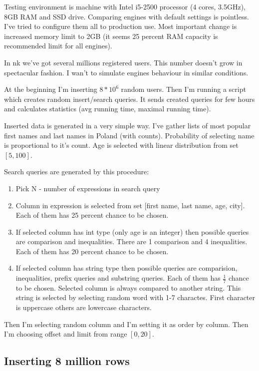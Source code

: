 \documentclass[10pt,a4paper]{article}
\begin{document}
Testing environment is machine with Intel i5-2500 processor (4 cores, 3.5GHz), 8GB RAM and SSD drive. Comparing engines with default settings is pointless. I've tried to configure them all to production use. Most important change is increased memory limit to 2GB (it seems 25 percent RAM capacity is recommended limit for all engines).

In nk we've got several millions registered users. This number doesn't grow in spectacular fashion. I wan't to simulate engines behaviour in similar conditions. 

At the beginning I'm inserting $8 * 10^6$ random users. Then I'm running a script which creates random insert/search queries. It sends created queries for few hours and calculates statistics (avg running time, maximal running time).

Inserted data is generated in a very simple way. I've gather lists of most popular first names and last names in Poland (with counts). Probability of selecting name is proportional to it's count. Age is selected with linear distribution from set $[5, 100]$.

Search queries are generated by this procedure:
\begin{enumerate}
\item Pick N - number of expressions in search query
\item Column in expression is selected from set [first name, last name, age, city]. Each of them has 25 percent chance to be chosen.
\item If selected column has int type (only age is an integer) then possible queries are comparison and inequalities. There are 1 comparison and 4 inequalities. Each of them has 20 percent chance to be chosen.
\item If selected column has string type then possible queries are comparision, inequalities, prefix queries and substring queries. Each of them has $\frac{1}{7}$ chance to be chosen. Selected column is always compared to another string. This string is selected by selecting random word with 1-7 charactes. First character is uppercase others are lowercase characters. 
\end{enumerate}

Then I'm selecting random column and I'm setting it as order by column. Then I'm choosing offset and limit from range $[0, 20]$.

\subsection{Inserting 8 million rows}
\end{document}
